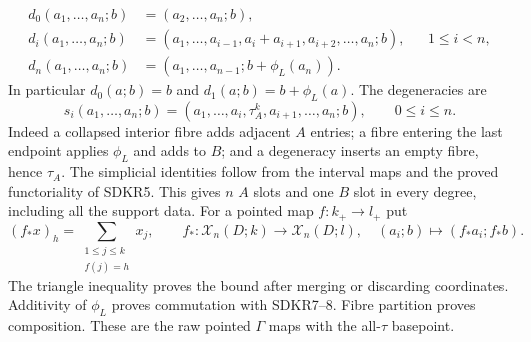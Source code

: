 \begin{equation}\tag{SDKR7}
\begin{aligned}
d_0(a_1,\ldots,a_n;b)&=(a_2,\ldots,a_n;b),\\
d_i(a_1,\ldots,a_n;b)
 &=(a_1,\ldots,a_{i-1},a_i+a_{i+1},a_{i+2},\ldots,a_n;b),
 &&1\le i<n,\\
d_n(a_1,\ldots,a_n;b)
 &=(a_1,\ldots,a_{n-1};b+\phi_L(a_n)).
\end{aligned}
\end{equation}
In particular $d_0(a;b)=b$ and $d_1(a;b)=b+\phi_L(a)$.
The degeneracies are
\begin{equation}\tag{SDKR8}
s_i(a_1,\ldots,a_n;b)
=(a_1,\ldots,a_i,\tau_A^k,a_{i+1},\ldots,a_n;b),
\qquad 0\le i\le n.
\end{equation}
Indeed a collapsed interior fibre adds adjacent $A$ entries;
a fibre entering the last endpoint applies $\phi_L$ and adds
to $B$; and a degeneracy inserts an empty fibre, hence $\tau_A$.
The simplicial identities follow from the interval maps and
the proved functoriality of SDKR5. This gives $n$ $A$ slots
and one $B$ slot in every degree, including all the support data.
For a pointed map $f:k_+\to l_+$ put
\begin{equation}\tag{SDKR9}
(f_*x)_h=\sum_{\substack{1\le j\le k\\f(j)=h}}x_j,\qquad
f_*:\mathcal X_n(D;k)\to\mathcal X_n(D;l),\quad
(a_i;b)\mapsto(f_*a_i;f_*b).
\end{equation}
The triangle inequality proves the bound after merging or
discarding coordinates. Additivity of $\phi_L$ proves commutation
with SDKR7--8. Fibre partition proves composition. These are the
raw pointed $\Gamma$ maps with the all-$\tau$ basepoint.
